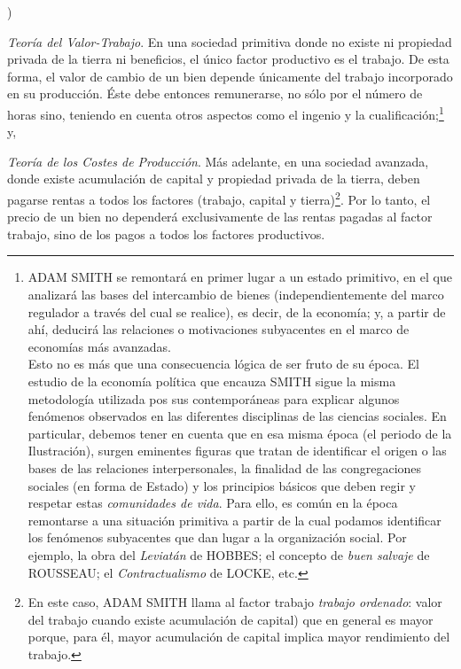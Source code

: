 \documentclass[10pt,a4paper]{article}
\newcounter{alphaitem}
\newenvironment{la}
      {\begin{list}{\alph{alphaitem})}{%
          \usecounter{alphaitem}%
          \setlength{\leftmargin}{1cm}%
          \setlength{\parskip}{3pt}%
          \setlength{\itemsep}{0pt}%
          \setlength{\parsep}{0pt}%
      }}
      {\end{list}}
\begin{document}
\begin{la}
    \item \textit{Teoría del Valor-Trabajo}. En una sociedad primitiva donde no existe ni propiedad privada de la tierra ni beneficios, el único factor productivo es el trabajo. De esta forma, el valor de cambio de un bien depende únicamente del trabajo incorporado en su producción. Éste debe entonces remunerarse, no sólo por el número de horas sino, teniendo en cuenta otros aspectos como el ingenio y la cualificación;\footnote{%
        ADAM SMITH se remontará en primer lugar a un estado primitivo, en el que analizará las bases del intercambio de bienes (independientemente del marco regulador a través del cual se realice), es decir, de la economía; y, a partir de ahí, deducirá las relaciones o motivaciones subyacentes en el marco de economías más avanzadas.\\ Esto no es más que una consecuencia lógica de ser fruto de su época. El estudio de la economía política que encauza SMITH sigue la misma metodología utilizada pos sus contemporáneas para explicar algunos fenómenos observados en las diferentes disciplinas de las ciencias sociales. En particular, debemos tener en cuenta que en esa misma época (el periodo de la Ilustración), surgen eminentes figuras que tratan de identificar el origen o las bases de las relaciones interpersonales, la finalidad de las congregaciones sociales (en forma de Estado) y los principios básicos que deben regir y respetar estas \textit{comunidades de vida}. Para ello, es común en la época remontarse a una situación primitiva a partir de la cual podamos identificar los fenómenos subyacentes que dan lugar a la organización social. Por ejemplo, la obra del \textit{Leviatán} de HOBBES; el concepto de \textit{buen salvaje} de ROUSSEAU; el \textit{Contractualismo} de LOCKE, etc.
    } y,
    \item \textit{Teoría de los Costes de Producción}. Más adelante, en una sociedad avanzada, donde existe acumulación de capital y propiedad privada de la tierra, deben pagarse rentas a todos los factores (trabajo, capital y tierra)\footnote{%
        En este caso, ADAM SMITH llama al factor trabajo \textit{trabajo ordenado}: valor del trabajo cuando existe acumulación de capital) que en general es mayor porque, para él, mayor acumulación de capital implica mayor rendimiento del trabajo.
    }. Por lo tanto, el precio de un bien no dependerá exclusivamente de las rentas pagadas al factor trabajo, sino de los pagos a todos los factores productivos.
\end{la} 
\end{document}
